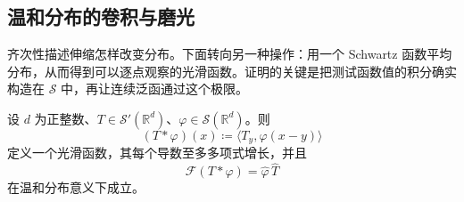 \subsection{温和分布的卷积与磨光}
\label{b2:subsec:050306}

齐次性描述伸缩怎样改变分布。下面转向另一种操作：用一个 Schwartz 函数平均分布，从而得到可以逐点观察的光滑函数。证明的关键是把测试函数值的积分确实构造在 \(\mathcal S\) 中，再让连续泛函通过这个极限。

\begin{proposition}\label{b2:prop:05-tempered-convolution}
设 \(d\) 为正整数、\(T\in\mathcal S'(\mathbb R^d)\)、\(\varphi\in\mathcal S(\mathbb R^d)\)。则
\[
 (T*\varphi)(x)\coloneqq\langle T_y,\varphi(x-y)\rangle
\]
定义一个光滑函数，其每个导数至多多项式增长，并且
\[
 \mathcal F(T*\varphi)=\widehat\varphi\,\widehat T
\]
在温和分布意义下成立。
\end{proposition}
